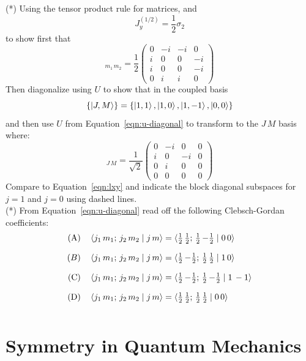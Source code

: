 \documentclass[12pt]{article}
\begin{document}
\exercise (*) Using the tensor product rule for matrices, and
$$J_y^{(1/2)} = \frac{1}{2}\sigma_2$$
to show first that
\begin{equation*}
[J_y]_{m_1\, m_2} = \frac{1}{2}\begin{pmatrix}0&-i&-i&0\\i&0&0&-i\\i&0&0&-i\\0&i&i&0\end{pmatrix}
\end{equation*}
Then diagonalize using $U$ to show that in the coupled basis
$$\{\ket{J,M}\} = \{\ket{1,1}, \ket{1,0}, \ket{1,-1}, \ket{0,0}\}$$
and then use $U$ from Equation~\ref{eqn:u-diagonal} to transform to the $J\,M$ basis where:
\begin{equation*}
[J_y]_{J\, M} = \frac{1}{\sqrt{2}}\begin{pmatrix}0&-i&0&0\\i&0&-i&0\\0&i&0&0\\0&0&0&0\end{pmatrix}
\end{equation*}
Compare to Equation~\ref{eqn:lxy} and indicate the block diagonal
subspaces for $j=1$ and $j=0$ using dashed lines.\\[5pt]

\exercise (*) From Equation~\ref{eqn:u-diagonal} read off the following Clebsch-Gordan coefficients:
\begin{align*}
\text{(A)} &\quad\braket{ j_1\, m_1;\, j_2\, m_2 \mid j\, m } = 
\braket{ \tfrac{1}{2}\, {\tfrac{1}{2}};\, \tfrac{1}{2}\, {-\tfrac{1}{2}} \mid 0\, 0 }\\[7pt]
\text{}(B) &\quad\braket{ j_1\, m_1;\, j_2\, m_2 \mid j\, m } = 
\braket{ \tfrac{1}{2}\, {-\tfrac{1}{2}};\, \tfrac{1}{2}\, {\tfrac{1}{2}} \mid 1\, 0 }\\[7pt]
\text{(C)} &\quad\braket{ j_1\, m_1;\, j_2\, m_2 \mid j\, m } = 
\braket{ \tfrac{1}{2}\, {-\tfrac{1}{2}};\, \tfrac{1}{2}\, {-\tfrac{1}{2}} \mid 1\, -1 }\\[7pt]
\text{(D)} &\quad\braket{ j_1\, m_1;\, j_2\, m_2 \mid j\, m } = 
\braket{ \tfrac{1}{2}\, {\tfrac{1}{2}};\, \tfrac{1}{2}\, {\tfrac{1}{2}} \mid 0\, 0 }\\[7pt]
\end{align*}

\section{Symmetry in Quantum Mechanics}
\end{document}
